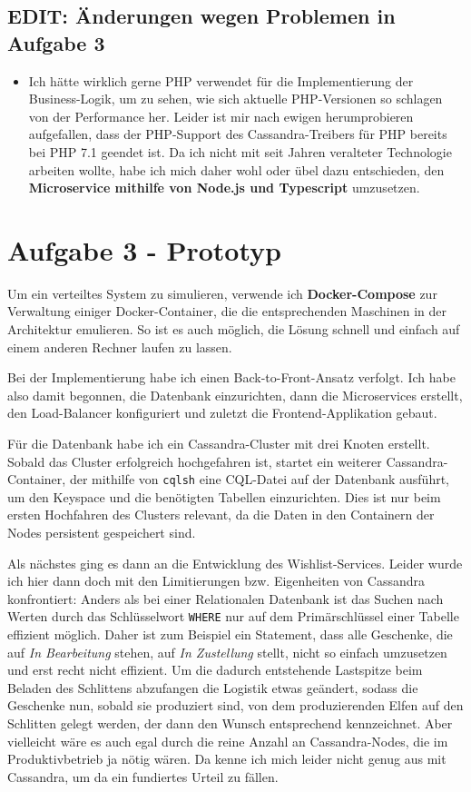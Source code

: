 \documentclass[12pt]{article}
\begin{document}
\subsection*{EDIT: Änderungen wegen Problemen in Aufgabe 3}
\begin{itemize}
	\item Ich hätte wirklich gerne PHP verwendet für die Implementierung der Business-Logik, um zu sehen, wie sich aktuelle PHP-Versionen so schlagen von der Performance her.
	Leider ist mir nach ewigen herumprobieren aufgefallen, dass der PHP-Support des Cassandra-Treibers für PHP bereits bei PHP 7.1 geendet ist.
	Da ich nicht mit seit Jahren veralteter Technologie arbeiten wollte, habe ich mich daher wohl oder übel dazu entschieden, den \textbf{Microservice mithilfe von Node.js und Typescript} umzusetzen.
\end{itemize}

\section*{Aufgabe 3 - Prototyp}
Um ein verteiltes System zu simulieren, verwende ich \textbf{Docker-Compose} zur Verwaltung einiger Docker-Container, die die entsprechenden Maschinen in der Architektur emulieren.
So ist es auch möglich, die Lösung schnell und einfach auf einem anderen Rechner laufen zu lassen.

Bei der Implementierung habe ich einen Back-to-Front-Ansatz verfolgt.
Ich habe also damit begonnen, die Datenbank einzurichten, dann die Microservices erstellt, den Load-Balancer konfiguriert und zuletzt die Frontend-Applikation gebaut.

Für die Datenbank habe ich ein Cassandra-Cluster mit drei Knoten erstellt. Sobald das Cluster erfolgreich hochgefahren ist, startet ein weiterer Cassandra-Container, der mithilfe von \texttt{cqlsh} eine CQL-Datei auf der Datenbank ausführt, um den Keyspace und die benötigten Tabellen einzurichten. Dies ist nur beim ersten Hochfahren des Clusters relevant, da die Daten in den Containern der Nodes persistent gespeichert sind.

Als nächstes ging es dann an die Entwicklung des Wishlist-Services.
Leider wurde ich hier dann doch mit den Limitierungen bzw. Eigenheiten von Cassandra konfrontiert:
Anders als bei einer Relationalen Datenbank ist das Suchen nach Werten durch das Schlüsselwort \texttt{WHERE} nur auf dem Primärschlüssel einer Tabelle effizient möglich.
Daher ist zum Beispiel ein Statement, dass alle Geschenke, die auf \emph{In Bearbeitung} stehen, auf \emph{In Zustellung} stellt, nicht so einfach umzusetzen und erst recht nicht effizient.
Um die dadurch entstehende Lastspitze beim Beladen des Schlittens abzufangen die Logistik etwas geändert, sodass die Geschenke nun, sobald sie produziert sind, von dem produzierenden Elfen auf den Schlitten gelegt werden, der dann den Wunsch entsprechend kennzeichnet.
Aber vielleicht wäre es auch egal durch die reine Anzahl an Cassandra-Nodes, die im Produktivbetrieb ja nötig wären.
Da kenne ich mich leider nicht genug aus mit Cassandra, um da ein fundiertes Urteil zu fällen.
\end{document}
